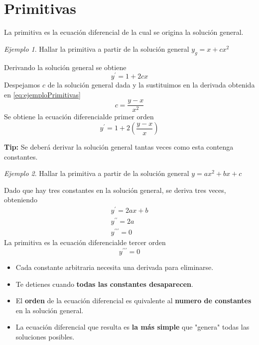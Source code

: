 \documentclass[12pt]{article} %
\theoremstyle{remark} %
\newtheorem{ejemplo}{Ejemplo}[section]
\newcommand{\ed}{ecuación diferencial}
\begin{document}
\section{Primitivas}
La primitiva es la ecuación diferencial de la cual se origina la solución general.
\begin{ejemplo}
  Hallar la primitiva a partir de la solución general $y_g = x + cx^2$

  Derivando la solución general se obtiene 
  \begin{equation}
    y^{\prime} = 1 + 2cx
    \label{eq:ejemploPrimitivas}
  \end{equation}
  Despejamos $c$ de la solución general dada y la sustituimos en la derivada obtenida en \ref{eq:ejemploPrimitivas}
  \[ c = \frac{y - x}{x^2} \]
  Se obtiene la \ed de primer orden \[ y^{\prime} = 1 + 2 \left( \frac{y-x}{x} \right) \]
\end{ejemplo}
\textbf{Tip:} Se deberá derivar la solución general tantas veces como esta contenga constantes.
\begin{ejemplo}
  Hallar la primitiva a partir de la solución general $y = ax^2 + bx + c$

  Dado que hay tres constantes en la solución general, se deriva tres veces, obteniendo
  \begin{gather*}
    y^{\prime} = 2ax + b\\
    y^{\prime \prime} = 2a\\
    y^{\prime \prime \prime} = 0
  \end{gather*}
  La primitiva es la \ed de tercer orden \[ y^{\prime \prime \prime} = 0\]
\end{ejemplo}
\begin{itemize}
  \item Cada constante arbitraria necesita una derivada para eliminarse.
  \item Te detienes cuando \textbf{todas las constantes desaparecen}.
  \item El \textbf{orden} de la ecuación diferencial es quivalente al \textbf{numero de constantes} en la solución general.
  \item La ecuación diferencial que resulta es \textbf{la más simple} que "genera" todas las soluciones posibles.
\end{itemize}
\end{document}
